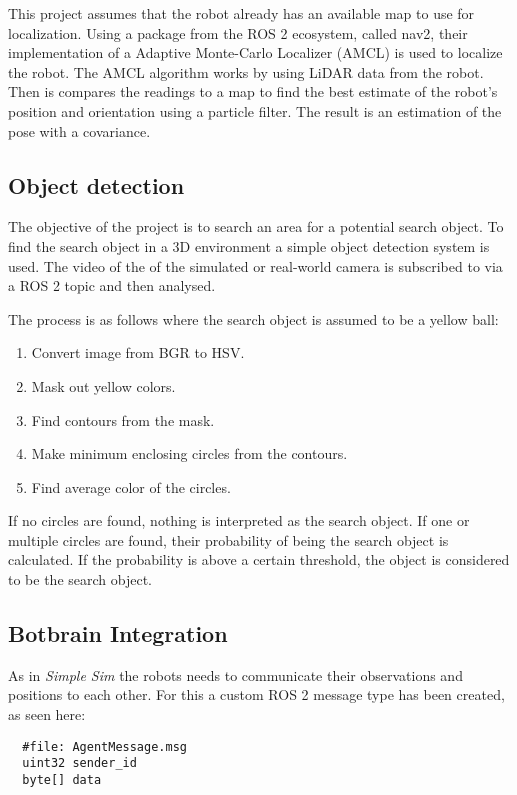 This project assumes that the robot already has an available map to use for localization. 
Using a package from the ROS 2 ecosystem, called nav2, their implementation of a Adaptive Monte-Carlo Localizer (AMCL) is used to localize the robot.
The AMCL algorithm works by using LiDAR data from the robot. Then is compares the readings to a map to find the best estimate of the robot's position and orientation using a particle filter. The result is an estimation of the pose with a covariance.

\subsection{Object detection}\label{sub:object_detection}
The objective of the project is to search an area for a potential search object.
To find the search object in a 3D environment a simple object detection system is used. The video of the of the simulated or real-world camera is subscribed to via a ROS 2 topic and then analysed. 

The process is as follows where the search object is assumed to be a yellow ball:
\begin{enumerate}
  \item Convert image from BGR to HSV.
  \item Mask out yellow colors. 
  \item Find contours from the mask.
  \item Make minimum enclosing circles from the contours.
  \item Find average color of the circles.
\end{enumerate}

If no circles are found, nothing is interpreted as the search object. If one or multiple circles are found, their probability of being the search object is calculated.
If the probability is above a certain threshold, the object is considered to be the search object.

\subsection{Botbrain Integration}\label{sub:Botbrain_integration}
As in \textit{Simple Sim} the robots needs to communicate their observations and positions to each other. For this a custom ROS 2 message type has been created, as seen here:
\begin{verbatim}
  #file: AgentMessage.msg
  uint32 sender_id
  byte[] data
\end{verbatim}

